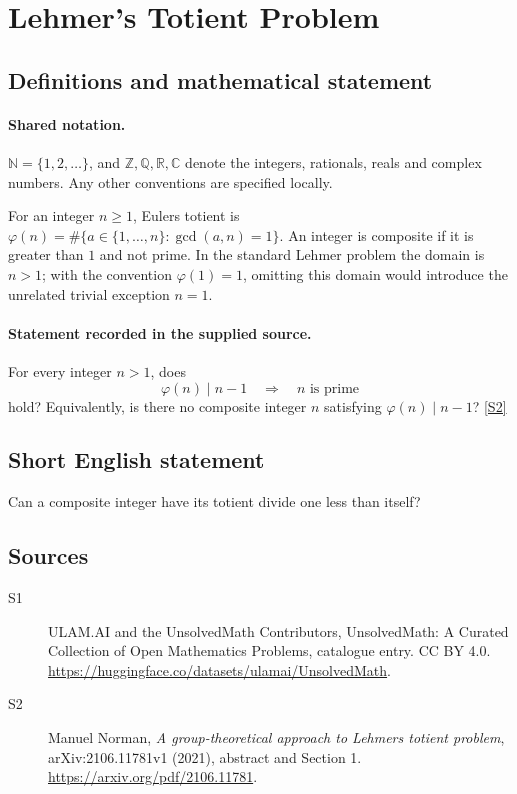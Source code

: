 \documentclass[11pt]{article}
\newcommand{\sref}[2]{\hyperlink{source:#1:#2}{[S#2]}}
\begin{document}
\section{Lehmer's Totient Problem}\label{statement}

\subsection{Definitions and mathematical statement}

\paragraph{Shared notation.}$\mathbb N=\{1,2,\ldots\}$, and $\mathbb Z,\mathbb Q,\mathbb R,\mathbb C$ denote the integers, rationals, reals and complex numbers. Any other conventions are specified locally.


For an integer $n\geq1$, Euler\textquotesingle s totient is $\varphi(n)=\#\{a\in\{1,\ldots,n\}:\gcd(a,n)=1\}$. An integer is composite if it is greater than $1$ and not prime. In the standard Lehmer problem the domain is $n>1$; with the convention $\varphi(1)=1$, omitting this domain would introduce the unrelated trivial exception $n=1$.
\paragraph{Statement recorded in the supplied source.}
For every integer $n>1$, does
\[
\varphi(n)\mid n-1\quad\Longrightarrow\quad n\text{ is prime}
\]
hold? Equivalently, is there no composite integer $n$ satisfying $\varphi(n)\mid n-1$? \sref{statement}{2}

\subsection{Short English statement}
Can a composite integer have its totient divide one less than itself?
\subsection{Sources}
\begin{description}
\item[\hypertarget{source:statement:1}{S1}] ULAM.AI and the UnsolvedMath Contributors, UnsolvedMath: A Curated Collection of Open Mathematics Problems, catalogue entry. CC BY 4.0. \url{https://huggingface.co/datasets/ulamai/UnsolvedMath}.
\item[\hypertarget{source:statement:2}{S2}] Manuel Norman, \emph{A group-theoretical approach to Lehmer\textquotesingle s totient problem}, arXiv:2106.11781v1 (2021), abstract and Section 1. \url{https://arxiv.org/pdf/2106.11781}.
\end{description}
\label{end:statement}
\end{document}
